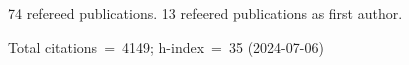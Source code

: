 74 refereed publications. 13 refeered publications as first author.

Total citations~=~4149; h-index~=~35 (2024-07-06)